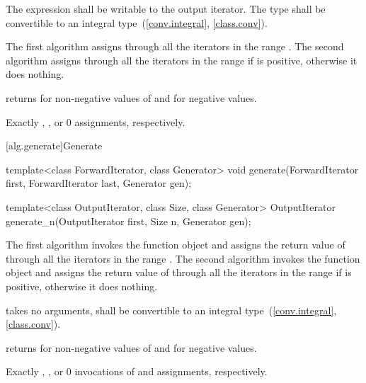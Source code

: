 \begin{itemdescr}
\pnum
\requires
The expression
shall be writable to the output iterator. The type
shall be convertible to an integral type~(\ref{conv.integral}, \ref{class.conv}).

\pnum
\effects
The first algorithm assigns  through all the iterators in the range
. The second algorithm assigns 
through all the iterators in the range 
if  is positive, otherwise it does nothing.

\pnum
\returns {} returns  for non-negative values of 
and  for negative values.

\pnum
\complexity
Exactly
,
, or 0 assignments, respectively.
\end{itemdescr}

[alg.generate]{Generate}

%
%
\begin{itemdecl}
template<class ForwardIterator, class Generator>
  void generate(ForwardIterator first, ForwardIterator last,
                Generator gen);

template<class OutputIterator, class Size, class Generator>
  OutputIterator generate_n(OutputIterator first, Size n, Generator gen);
\end{itemdecl}

\begin{itemdescr}
\pnum
\effects
The first algorithm invokes the function object  and assigns the return
value of  through all the iterators in the range
. The second algorithm invokes the function object
 and assigns the return value of  through all the iterators in
the range  if  is positive,
otherwise it does nothing.

\pnum
\requires
{} takes no arguments,
shall be convertible to an integral type~(\ref{conv.integral}, \ref{class.conv}).

\pnum
\returns {} returns  for non-negative values of 
and  for negative values.

\pnum
\complexity
Exactly
,
, or 0
invocations of  and assignments, respectively.
\end{itemdescr}

